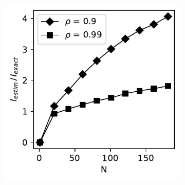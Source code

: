 \documentclass[../Thesis.tex]{subfiles}
\begin{document}
\begin{figure}[H]
\begin{subfigure}[t]{0.32\textwidth}
        \caption{}
        \label{subfig:dd}
    \end{subfigure}%
    ~
    \begin{subfigure}[t]{0.32\textwidth}
        \centering
        \includegraphics[width=\linewidth]{figures/ND examples/MI calc/gaussian example original high corr.pdf}
        \caption{}
        \label{subfig:ddd}
    \end{subfigure}
    \caption{}
    \label{fig:raw histogram for MI estimation}
\end{figure}
\end{document}
